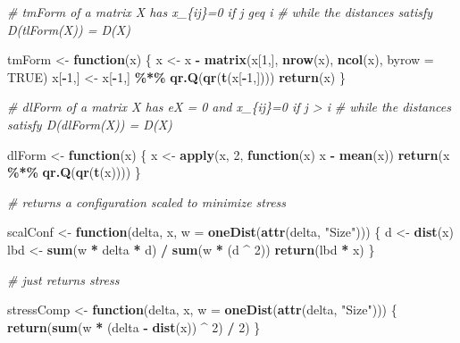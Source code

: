 \documentclass[
  12pt,
]{article}
\newenvironment{Shaded}{\begin{snugshade}}{\end{snugshade}}
\newcommand{\AttributeTok}[1]{\textcolor[rgb]{0.13,0.29,0.53}{#1}}
\newcommand{\CommentTok}[1]{\textcolor[rgb]{0.56,0.35,0.01}{\textit{#1}}}
\newcommand{\ConstantTok}[1]{\textcolor[rgb]{0.56,0.35,0.01}{#1}}
\newcommand{\ControlFlowTok}[1]{\textcolor[rgb]{0.13,0.29,0.53}{\textbf{#1}}}
\newcommand{\DecValTok}[1]{\textcolor[rgb]{0.00,0.00,0.81}{#1}}
\newcommand{\FunctionTok}[1]{\textcolor[rgb]{0.13,0.29,0.53}{\textbf{#1}}}
\newcommand{\NormalTok}[1]{#1}
\newcommand{\OtherTok}[1]{\textcolor[rgb]{0.56,0.35,0.01}{#1}}
\newcommand{\SpecialCharTok}[1]{\textcolor[rgb]{0.81,0.36,0.00}{\textbf{#1}}}
\newcommand{\StringTok}[1]{\textcolor[rgb]{0.31,0.60,0.02}{#1}}
\begin{document}
\begin{Shaded}
\begin{Highlighting}[]
\CommentTok{\# tmForm of a matrix X has x\_\{ij\}=0 if j geq i}
\CommentTok{\# while the distances satisfy D(tlForm(X)) = D(X)}

\NormalTok{tmForm }\OtherTok{\textless{}{-}} \ControlFlowTok{function}\NormalTok{(x) \{}
\NormalTok{  x }\OtherTok{\textless{}{-}}\NormalTok{ x }\SpecialCharTok{{-}} \FunctionTok{matrix}\NormalTok{(x[}\DecValTok{1}\NormalTok{,], }\FunctionTok{nrow}\NormalTok{(x), }\FunctionTok{ncol}\NormalTok{(x), }\AttributeTok{byrow =} \ConstantTok{TRUE}\NormalTok{)}
\NormalTok{  x[}\SpecialCharTok{{-}}\DecValTok{1}\NormalTok{,] }\OtherTok{\textless{}{-}}\NormalTok{ x[}\SpecialCharTok{{-}}\DecValTok{1}\NormalTok{,] }\SpecialCharTok{\%*\%} \FunctionTok{qr.Q}\NormalTok{(}\FunctionTok{qr}\NormalTok{(}\FunctionTok{t}\NormalTok{(x[}\SpecialCharTok{{-}}\DecValTok{1}\NormalTok{,])))}
  \FunctionTok{return}\NormalTok{(x)}
\NormalTok{\}}

\CommentTok{\# dlForm of a matrix X has e\textquotesingle{}X = 0 and x\_\{ij\}=0 if j \textgreater{} i}
\CommentTok{\# while the distances satisfy D(dlForm(X)) = D(X)}

\NormalTok{dlForm }\OtherTok{\textless{}{-}} \ControlFlowTok{function}\NormalTok{(x) \{}
\NormalTok{  x }\OtherTok{\textless{}{-}} \FunctionTok{apply}\NormalTok{(x, }\DecValTok{2}\NormalTok{, }\ControlFlowTok{function}\NormalTok{(x)}
\NormalTok{    x }\SpecialCharTok{{-}} \FunctionTok{mean}\NormalTok{(x))}
  \FunctionTok{return}\NormalTok{(x }\SpecialCharTok{\%*\%} \FunctionTok{qr.Q}\NormalTok{(}\FunctionTok{qr}\NormalTok{(}\FunctionTok{t}\NormalTok{(x))))}
\NormalTok{\}}

\CommentTok{\# returns a configuration scaled to minimize stress}

\NormalTok{scalConf }\OtherTok{\textless{}{-}} \ControlFlowTok{function}\NormalTok{(delta, x, }\AttributeTok{w =} \FunctionTok{oneDist}\NormalTok{(}\FunctionTok{attr}\NormalTok{(delta, }\StringTok{"Size"}\NormalTok{))) \{}
\NormalTok{  d }\OtherTok{\textless{}{-}} \FunctionTok{dist}\NormalTok{(x)}
\NormalTok{  lbd }\OtherTok{\textless{}{-}} \FunctionTok{sum}\NormalTok{(w }\SpecialCharTok{*}\NormalTok{ delta }\SpecialCharTok{*}\NormalTok{ d) }\SpecialCharTok{/} \FunctionTok{sum}\NormalTok{(w }\SpecialCharTok{*}\NormalTok{ (d }\SpecialCharTok{\^{}} \DecValTok{2}\NormalTok{))}
  \FunctionTok{return}\NormalTok{(lbd }\SpecialCharTok{*}\NormalTok{ x)}
\NormalTok{\}}

\CommentTok{\# just returns stress}

\NormalTok{stressComp }\OtherTok{\textless{}{-}} \ControlFlowTok{function}\NormalTok{(delta, x, }\AttributeTok{w =} \FunctionTok{oneDist}\NormalTok{(}\FunctionTok{attr}\NormalTok{(delta, }\StringTok{"Size"}\NormalTok{))) \{}
  \FunctionTok{return}\NormalTok{(}\FunctionTok{sum}\NormalTok{(w }\SpecialCharTok{*}\NormalTok{ (delta }\SpecialCharTok{{-}} \FunctionTok{dist}\NormalTok{(x)) }\SpecialCharTok{\^{}} \DecValTok{2}\NormalTok{) }\SpecialCharTok{/} \DecValTok{2}\NormalTok{)}
\NormalTok{\}}


\end{Highlighting}
\end{Shaded}
\end{document}
